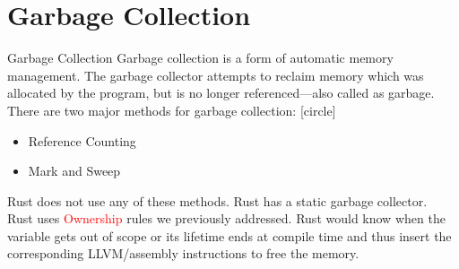 \documentclass[10pt,xcolor={dvipsnames}, aspectratio=169]{beamer}
\begin{document}
\section{Garbage Collection}
\begin{frame}[fragile]{Garbage Collection}
	    Garbage collection is a form of automatic memory management. The garbage collector attempts to reclaim memory which was allocated by the program, but is no longer referenced—also called as garbage. \\ There are two major methods for garbage collection:
	    [circle]
	    \begin{itemize}
	        \item Reference Counting
	        \item Mark and Sweep
	    \end{itemize}

	    Rust does not use any of these methods. Rust has a static garbage collector.\\
        Rust uses \textcolor{red}{Ownership} rules we previously addressed. Rust would know when the variable gets out of scope or its lifetime ends at compile time and thus insert the corresponding LLVM/assembly instructions to free the memory.
\end{frame}
\end{document}
